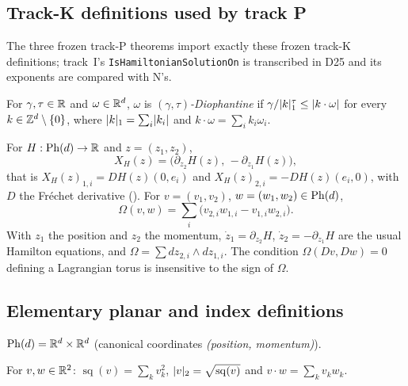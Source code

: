 \subsection{Track-K definitions used by track P}\label{bpP:p0:kdefs}

The three frozen track-P theorems import exactly these frozen track-K definitions; track~I's \texttt{IsHamiltonianSolutionOn} is transcribed in D25 and its exponents are compared with N's.

\begin{definition}\label{bpP:p0:diophantine}
For $\gamma,\tau\in\mathbb{R}$ and $\omega\in\mathbb{R}^d$, $\omega$ is \emph{$(\gamma,\tau)$-Diophantine} if
$\gamma/\lvert k\rvert_1^{\tau}\le\lvert k\cdot\omega\rvert$ for every $k\in\mathbb{Z}^d\setminus\{0\}$, where $\lvert k\rvert_1=\sum_i\lvert k_i\rvert$
and $k\cdot\omega=\sum_ik_i\omega_i$.
\end{definition}

\begin{definition}\label{bpP:p0:hamsymp}
For $H:\mathrm{Ph}(d)\to\mathbb{R}$ and $z=(z_1,z_2)$,
\[X_H(z)=\bigl(\partial_{z_2}H(z),\,-\partial_{z_1}H(z)\bigr),\]
that is $X_H(z)_{1,i}=DH(z)(0,e_i)$ and $X_H(z)_{2,i}=-DH(z)(e_i,0)$, with $D$ the Fr\'echet derivative ().
For $v=(v_1,v_2)$, $w=(w_1,w_2)\in\mathrm{Ph}(d)$,
\[\Omega(v,w)=\sum_i\bigl(v_{2,i}w_{1,i}-v_{1,i}w_{2,i}\bigr).\]
With $z_1$ the position and $z_2$ the momentum, $\dot z_1=\partial_{z_2}H$, $\dot z_2=-\partial_{z_1}H$ are the
usual Hamilton equations, and $\Omega=\sum dz_{2,i}\wedge dz_{1,i}$. The condition $\Omega(Dv,Dw)=0$ defining a
Lagrangian torus is insensitive to the sign of $\Omega$.
\end{definition}

\subsection{Elementary planar and index definitions}\label{bpP:p0:elementary}

\begin{definition}\label{bpP:p0:phase}
$\mathrm{Ph}(d)=\mathbb{R}^d\times\mathbb{R}^d$ (canonical coordinates \emph{(position, momentum)}).
\end{definition}

\begin{definition}\label{bpP:p0:plane}
For $v,w\in\mathbb{R}^2$: $\operatorname{sq}(v)=\sum_kv_k^2$, $\lvert v\rvert_2=\sqrt{\operatorname{sq}(v)}$ and $v\cdot w=\sum_kv_kw_k$.
\end{definition}

